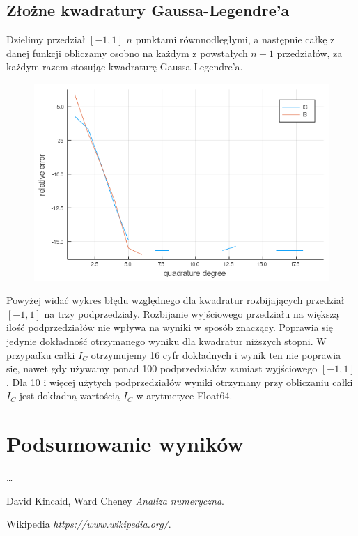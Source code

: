 \documentclass{article}
\begin{document}
\subsection*{Złożne kwadratury Gaussa-Legendre'a}
	Dzielimy przedział $[-1,1]$ $n$ punktami równnodległymi, a następnie całkę z danej funkcji obliczamy osobno na każdym z powstałych $n-1$ przedziałów, za każdym razem stosując kwadraturę Gaussa-Legendre'a. 

\begin{figure}[ht]
    \includegraphics[scale=0.5]{WykresD2relative.png}
    \label{WykresD2rel}
\end{figure}
Powyżej widać wykres błędu względnego dla kwadratur rozbijających przedział $[-1,1]$ na trzy podprzedziały. Rozbijanie wyjściowego przedziału na większą ilość podprzedziałów nie wpływa na wyniki w sposób znaczący. Poprawia się jedynie dokładność otrzymanego wyniku dla kwadratur niższych stopni. W przypadku całki $I_C$ otrzymujemy 16 cyfr dokładnych i wynik ten nie poprawia się, nawet gdy używamy ponad 100 podprzedziałów zamiast wyjściowego $[-1,1]$. Dla 10 i więcej użytych podprzedziałów wyniki otrzymany przy obliczaniu całki $I_C$ jest dokładną wartością $I_C$ w arytmetyce Float64.  


\section*{Podsumowanie wyników}
\dots
\begin{thebibliography}{9}

  
  David Kincaid, Ward Cheney
  \emph{Analiza numeryczna}.

  Wikipedia
  \emph{https://www.wikipedia.org/}.

\end{thebibliography}
\end{document}
